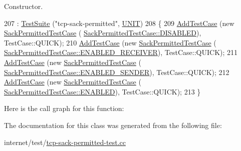 Constructor. 


\begin{DoxyCode}
207     : \hyperlink{classns3_1_1TestSuite_a904b0c40583b744d30908aeb94636d1a}{TestSuite} (\textcolor{stringliteral}{"tcp-sack-permitted"}, \hyperlink{classns3_1_1TestSuite_a1ebfcab34ec8161e085e8e3a1855eae0a3885375a3787abf60431f8454b3cadbd}{UNIT})
208   \{
209     \hyperlink{classns3_1_1TestCase_a3718088e3eefd5d6454569d2e0ddd835}{AddTestCase} (\textcolor{keyword}{new} \hyperlink{classSackPermittedTestCase}{SackPermittedTestCase} (
      \hyperlink{classSackPermittedTestCase_a2dc95ae5e965bc36df7ea84c64723493ac7dca56a5fac1080b2ee4d83cfa2005e}{SackPermittedTestCase::DISABLED}), TestCase::QUICK);
210     \hyperlink{classns3_1_1TestCase_a3718088e3eefd5d6454569d2e0ddd835}{AddTestCase} (\textcolor{keyword}{new} \hyperlink{classSackPermittedTestCase}{SackPermittedTestCase} (
      \hyperlink{classSackPermittedTestCase_a2dc95ae5e965bc36df7ea84c64723493a3c0e8b65f47a69fca9d52f403274742c}{SackPermittedTestCase::ENABLED\_RECEIVER}), TestCase::QUICK);
211     \hyperlink{classns3_1_1TestCase_a3718088e3eefd5d6454569d2e0ddd835}{AddTestCase} (\textcolor{keyword}{new} \hyperlink{classSackPermittedTestCase}{SackPermittedTestCase} (
      \hyperlink{classSackPermittedTestCase_a2dc95ae5e965bc36df7ea84c64723493aef344cc4eec6eedc3e644b86edc4db95}{SackPermittedTestCase::ENABLED\_SENDER}), TestCase::QUICK);
212     \hyperlink{classns3_1_1TestCase_a3718088e3eefd5d6454569d2e0ddd835}{AddTestCase} (\textcolor{keyword}{new} \hyperlink{classSackPermittedTestCase}{SackPermittedTestCase} (
      \hyperlink{classSackPermittedTestCase_a2dc95ae5e965bc36df7ea84c64723493a895f2f11241beaf1334839f4056a0531}{SackPermittedTestCase::ENABLED}), TestCase::QUICK);
213   \}
\end{DoxyCode}


Here is the call graph for this function\+:




The documentation for this class was generated from the following file\+:\begin{DoxyCompactItemize}
\item 
internet/test/\hyperlink{tcp-sack-permitted-test_8cc}{tcp-\/sack-\/permitted-\/test.\+cc}\end{DoxyCompactItemize}
